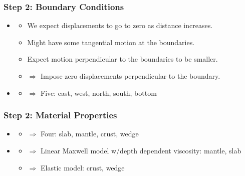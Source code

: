 \documentclass[aspectratio=169]{beamer}
\begin{document}
\begin{frame}
  \frametitle{Step 2: Boundary Conditions}
  \summary{}

  \begin{itemize}
  \item {}\pause
    \begin{itemize}
    \item We expect displacements to go to zero as distance increases.
    \item Might have some tangential motion at the boundaries.
    \item Expect motion perpendicular to the boundaries to be smaller.\pause
    \item $\Rightarrow$ Impose zero displacements perpendicular to the boundary.\pause
    \end{itemize}
  \item {}\pause
    \begin{itemize}
    \item $\Rightarrow$ Five: east, west, north, south, bottom
    \end{itemize}
  \end{itemize}  
  
\end{frame}


\begin{frame}
  \frametitle{Step 2: Material Properties}
  \summary{}

  \begin{itemize}
  \item {}\pause
    \begin{itemize}
    \item $\Rightarrow$ Four: slab, mantle, crust, wedge\pause
    \end{itemize}
  \item {}\pause
    \begin{itemize}
    \item $\Rightarrow$ Linear Maxwell model w/depth dependent viscosity: mantle, slab
    \item $\Rightarrow$ Elastic model: crust, wedge
    \end{itemize}
  \end{itemize}
  
\end{frame}
\end{document}
